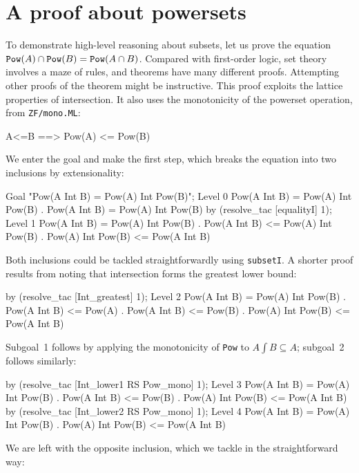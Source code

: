 \section{A proof about powersets}\label{sec:ZF-pow-example}
To demonstrate high-level reasoning about subsets, let us prove the
equation ${{\tt Pow}(A)\cap {\tt Pow}(B)}= {\tt Pow}(A\cap B)$.  Compared
with first-order logic, set theory involves a maze of rules, and theorems
have many different proofs.  Attempting other proofs of the theorem might
be instructive.  This proof exploits the lattice properties of
intersection.  It also uses the monotonicity of the powerset operation,
from \texttt{ZF/mono.ML}:
\begin{ttbox}
      A<=B ==> Pow(A) <= Pow(B)
\end{ttbox}
We enter the goal and make the first step, which breaks the equation into
two inclusions by extensionality:
\begin{ttbox}
Goal "Pow(A Int B) = Pow(A) Int Pow(B)";
{\out Level 0}
{\out Pow(A Int B) = Pow(A) Int Pow(B)}
{. Pow(A Int B) = Pow(A) Int Pow(B)}
\ttbreak
by (resolve_tac [equalityI] 1);
{\out Level 1}
{\out Pow(A Int B) = Pow(A) Int Pow(B)}
{. Pow(A Int B) <= Pow(A) Int Pow(B)}
{. Pow(A) Int Pow(B) <= Pow(A Int B)}
\end{ttbox}
Both inclusions could be tackled straightforwardly using \texttt{subsetI}.
A shorter proof results from noting that intersection forms the greatest
lower bound:
\begin{ttbox}
by (resolve_tac [Int_greatest] 1);
{\out Level 2}
{\out Pow(A Int B) = Pow(A) Int Pow(B)}
{. Pow(A Int B) <= Pow(A)}
{. Pow(A Int B) <= Pow(B)}
{. Pow(A) Int Pow(B) <= Pow(A Int B)}
\end{ttbox}
Subgoal~1 follows by applying the monotonicity of \texttt{Pow} to $A\int
B\subseteq A$; subgoal~2 follows similarly:
\begin{ttbox}
by (resolve_tac [Int_lower1 RS Pow_mono] 1);
{\out Level 3}
{\out Pow(A Int B) = Pow(A) Int Pow(B)}
{. Pow(A Int B) <= Pow(B)}
{. Pow(A) Int Pow(B) <= Pow(A Int B)}
\ttbreak
by (resolve_tac [Int_lower2 RS Pow_mono] 1);
{\out Level 4}
{\out Pow(A Int B) = Pow(A) Int Pow(B)}
{. Pow(A) Int Pow(B) <= Pow(A Int B)}
\end{ttbox}
We are left with the opposite inclusion, which we tackle in the
straightforward way:
